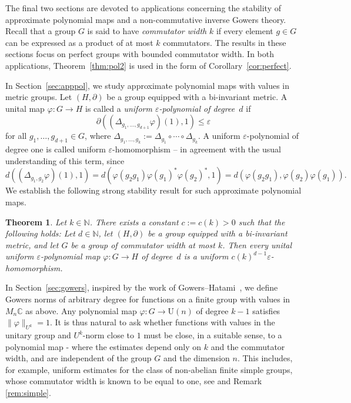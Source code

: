 \documentclass[a4paper,11pt]{amsproc}
\theoremstyle{plain}
\newtheorem{theorem}{Theorem}[section]
\theoremstyle{definition}
\begin{document}
The final two sections are devoted to applications concerning the stability of approximate polynomial maps and a non-commutative inverse Gowers theory. Recall that a group $G$ is said to have \emph{commutator width} $k$ if every element $g \in G$ can be expressed as a product of at most $k$ commutators. The results in these sections focus on perfect groups with bounded commutator width. In both applications, Theorem~\ref{thm:pol2} is used in the form of Corollary~\ref{cor:perfect}.



In Section~\ref{sec:apppol}, we study approximate polynomial maps with values in metric groups. Let $(H, \partial)$ be a group equipped with a bi-invariant metric. A unital map $\varphi \colon G \to H$ is called a \emph{uniform $\varepsilon$-polynomial of degree~$d$} if
\[
\partial((\Delta_{g_1, \dots, g_{d+1}} \varphi)(1), 1) \leq \varepsilon
\]
for all $g_1, \dots, g_{d+1} \in G$, where $\Delta_{g_1, \dots, g_k} := \Delta_{g_1} \circ \cdots \circ \Delta_{g_k}$. A uniform $\varepsilon$-polynomial of degree one is called uniform $\varepsilon$-homomorphism -- in agreement with the usual understanding of this term, since
$$d((\Delta_{g_1,g_2} \varphi)(1),1) = d(\varphi(g_2g_1)\varphi(g_1)^* \varphi(g_2)^*,1) = d(\varphi(g_2g_1),\varphi(g_2)\varphi(g_1)).$$ We establish the following strong stability result for such approximate polynomial maps.

\begin{theorem} \label{thm:approx}
Let $k \in \mathbb{N}$. There exists a constant $c := c(k) > 0$ such that the following holds:  
Let $d \in \mathbb{N}$, let $(H, \partial)$ be a group equipped with a bi-invariant metric, and let $G$ be a group of commutator width at most $k$. Then every unital uniform $\varepsilon$-polynomial map $\varphi \colon G \to H$ of degree~$d$ is a uniform $c(k)^{d-1} \varepsilon$-homomorphism.
\end{theorem}

In Section~\ref{sec:gowers}, inspired by the work of Gowers--Hatami~\cite{MR3733361}, we define Gowers norms of arbitrary degree for functions on a finite group with values in $M_n \mathbb{C}$ as above. Any polynomial map $\varphi \colon G \to \mathrm{U}(n)$ of degree $k-1$ satisfies $\|\varphi\|_{U^k} = 1$. It is thus natural to ask whether functions with values in the unitary group and $U^k$-norm close to $1$ must be close, in a suitable sense, to a polynomial map - where the estimates depend only on $k$ and the commutator width, and are independent of the group $G$ and the dimension $n$. This includes, for example, uniform estimates for the class of non-abelian finite simple groups, whose commutator width is known to be equal to one, see \cite{ore} and Remark \ref{rem:simple}.
\end{document}
